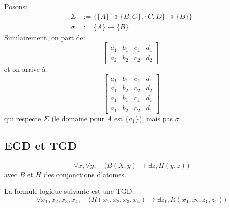 \documentclass[french, toc]{../cs-classes/cs-classes}
\begin{document}
\begin{exemple}
    Posons:
    \begin{equation*}
        \begin{aligned}
            \Sigma &:= \{\{A\}\twoheadrightarrow\{B, C\}, \{C, D\}\twoheadrightarrow\{B\}\}\\
            \sigma &:= \{A\} \rightarrow \{B\}
        \end{aligned}
    \end{equation*}
    Similairement, on part de:
    \begin{equation*}
        \begin{bmatrix}
            a_1&b_1&c_1&d_1\\
            a_2&b_2&c_2&d_2
        \end{bmatrix}
    \end{equation*}
    et on arrive à:
    \begin{equation*}
        \begin{bmatrix}
            a_1&b_1&c_1&d_1\\
            a_1&b_2&c_2&d_2\\
            a_1&b_1&c_1&d_1\\
            a_1&b_2&c_2&d_1
        \end{bmatrix}
    \end{equation*}
    qui respecte $\Sigma$ (le domaine pour $A$ est $\{a_1\}$), mais pas $\sigma$.
\end{exemple}

\subsection{EGD et TGD}
\begin{definition}
    \begin{equation*}
        \forall x, \forall y, \quad \big(B(X, y) \rightarrow \exists z, H(y, z)\big)
    \end{equation*}
    avec $B$ et $H$ des conjonctions d'atomes.
\end{definition}

\begin{exemple}
    La formule logique suivante est une TGD:
    \begin{equation*}
        \forall x_1, x_2, x_3, x_4, \quad \big(R(x_1, x_2, x_3, x_4) \rightarrow \exists z_1, R(x_1, x_2, z_1, z_1)\big)
    \end{equation*}
\end{exemple}
\end{document}
